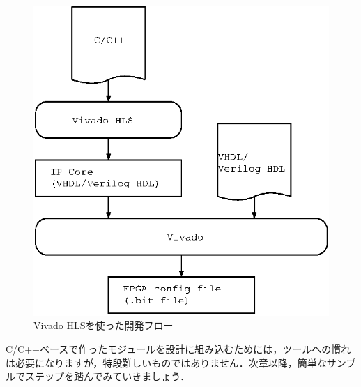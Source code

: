 \documentclass[a4paper,dvipdfmx]{jsarticle}
\begin{document}
 \begin{figure}[H]
  \begin{center}
   \includegraphics[width=.55\textwidth]{chapter07_figures/hls_dev_flow.eps}
  \end{center}
  \caption{Vivado HLSを使った開発フロー \label{fig:hls_dev_flow}}
 \end{figure}


C/C++ベースで作ったモジュールを設計に組み込むためには，ツールへの慣れは必要になりますが，特段難しいものではありません．次章以降，簡単なサンプルでステップを踏んでみていきましょう．
\end{document}

